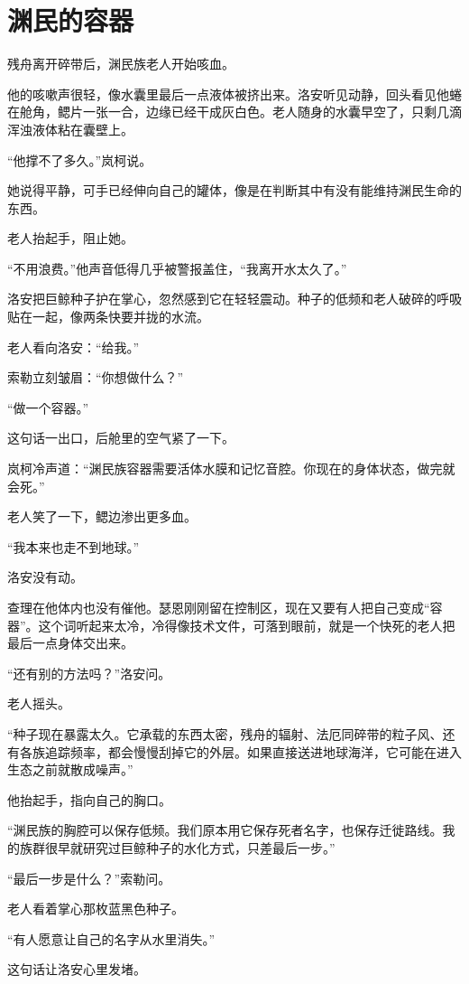\chapter{渊民的容器}

残舟离开碎带后，渊民族老人开始咳血。

他的咳嗽声很轻，像水囊里最后一点液体被挤出来。洛安听见动静，回头看见他蜷在舱角，鳃片一张一合，边缘已经干成灰白色。老人随身的水囊早空了，只剩几滴浑浊液体粘在囊壁上。

“他撑不了多久。”岚柯说。

她说得平静，可手已经伸向自己的罐体，像是在判断其中有没有能维持渊民生命的东西。

老人抬起手，阻止她。

“不用浪费。”他声音低得几乎被警报盖住，“我离开水太久了。”

洛安把巨鲸种子护在掌心，忽然感到它在轻轻震动。种子的低频和老人破碎的呼吸贴在一起，像两条快要并拢的水流。

老人看向洛安：“给我。”

索勒立刻皱眉：“你想做什么？”

“做一个容器。”

这句话一出口，后舱里的空气紧了一下。

岚柯冷声道：“渊民族容器需要活体水膜和记忆音腔。你现在的身体状态，做完就会死。”

老人笑了一下，鳃边渗出更多血。

“我本来也走不到地球。”

洛安没有动。

查理在他体内也没有催他。瑟恩刚刚留在控制区，现在又要有人把自己变成“容器”。这个词听起来太冷，冷得像技术文件，可落到眼前，就是一个快死的老人把最后一点身体交出来。

“还有别的方法吗？”洛安问。

老人摇头。

“种子现在暴露太久。它承载的东西太密，残舟的辐射、法厄同碎带的粒子风、还有各族追踪频率，都会慢慢刮掉它的外层。如果直接送进地球海洋，它可能在进入生态之前就散成噪声。”

他抬起手，指向自己的胸口。

“渊民族的胸腔可以保存低频。我们原本用它保存死者名字，也保存迁徙路线。我的族群很早就研究过巨鲸种子的水化方式，只差最后一步。”

“最后一步是什么？”索勒问。

老人看着掌心那枚蓝黑色种子。

“有人愿意让自己的名字从水里消失。”

这句话让洛安心里发堵。

